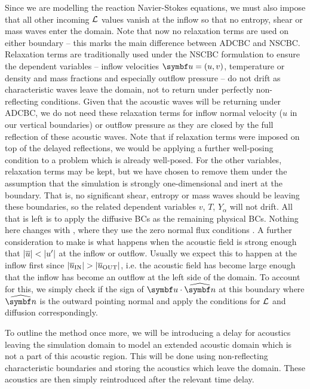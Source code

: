 Since we are modelling the reaction Navier-Stokes equations, we must also impose that all other incoming $\mathcal{L}$ values vanish at the inflow so that no entropy, shear or mass waves enter the domain. Note that now no relaxation terms are used on either boundary -- this marks the main difference between ADCBC and NSCBC. Relaxation terms are traditionally used under the NSCBC formulation to ensure the dependent variables -- inflow velocities $\vb{u}=(u, v)$, temperature or density and mass fractions and especially outflow pressure -- do not drift as characteristic waves leave the domain, not to return under perfectly non-reflecting conditions. Given that the acoustic waves will be returning under ADCBC, we do not need these relaxation terms for inflow normal velocity ($u$ in our vertical boundaries) or outflow pressure as they are closed by the full reflection of these acoustic waves. Note that if relaxation terms were imposed on top of the delayed reflections, we would be applying a further well-posing condition to a problem which is already well-posed. For the other variables, relaxation terms may be kept, but we have chosen to remove them under the assumption that the simulation is strongly one-dimensional and inert at the boundary. That is, no significant shear, entropy or mass waves should be leaving these boundaries, so the related dependent variables $v$, $T$, $Y_α$ will not drift. All that is left is to apply the diffusive BCs as the remaining physical BCs. Nothing here changes with \cite{sutherland2003ImprovedBoundaryConditions}, where they use the zero normal flux conditions . A further consideration to make is what happens when the acoustic field is strong enough that $\abs{\overline{u}} < \abs{u'}$ at the inflow or outflow. Usually we expect this to happen at the inflow first since $\abs{\overline{u}_{\mathrm{IN}}} > \abs{\overline{u}_{\mathrm{OUT}}}$, i.e. the acoustic field has become large enough that the inflow has become an outflow at the left side of the domain. To account for this, we simply check if the sign of $\vb{u}\cdot\uvec{n}$ at this boundary where $\uvec{n}$ is the outward pointing normal and apply the conditions for $\mathcal{L}$ and diffusion correspondingly.

To outline the method once more, we will be introducing a delay for acoustics leaving the simulation domain to model an extended acoustic domain which is not a part of this acoustic region. This will be done using non-reflecting characteristic boundaries and storing the acoustics which leave the domain. These acoustics are then simply reintroduced after the relevant time delay.

